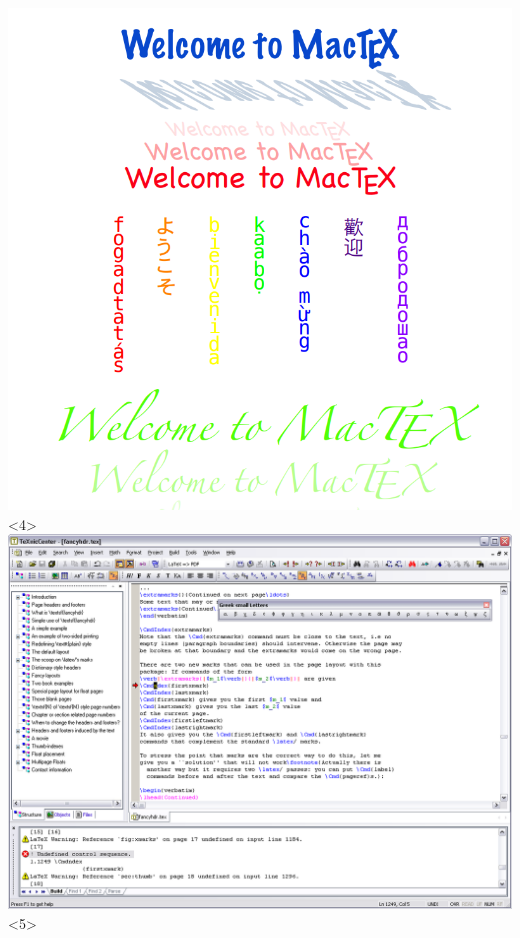 \documentclass{beamer}
\begin{document}
{\begin{columns}[onlytextwidth,T]
				\includegraphics[width=\linewidth]{mactex.png}<4>
				\includegraphics[width=\linewidth]{miktex.png}<5>
			\end{columns}
		}
	
\end{document}

